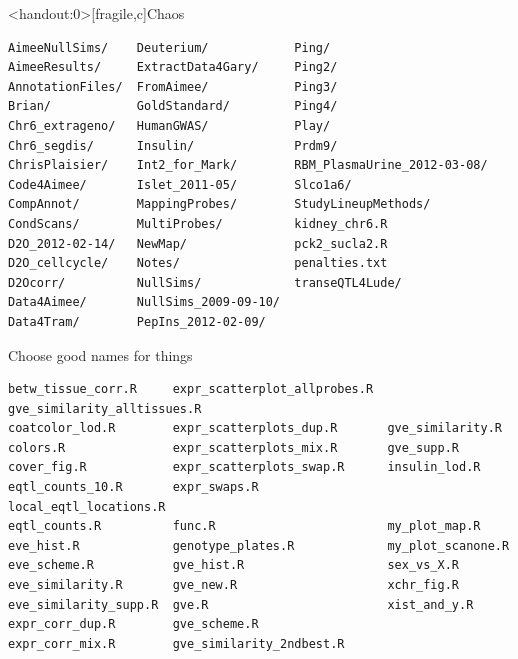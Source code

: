 \documentclass[aspectratio=169,12pt,t]{beamer}
\begin{document}
\begin{frame}<handout:0>[fragile,c]{Chaos}

\addtocounter{framenumber}{-1}

\begin{center}
\begin{minipage}[c]{11.33cm}
\begin{semiverbatim}
\lstset{basicstyle=\scriptsize}
\begin{lstlisting}[linewidth=11.33cm]
AimeeNullSims/    Deuterium/            Ping/
AimeeResults/     ExtractData4Gary/     Ping2/
AnnotationFiles/  FromAimee/            Ping3/
Brian/            GoldStandard/         Ping4/
Chr6_extrageno/   HumanGWAS/            Play/
Chr6_segdis/      Insulin/              Prdm9/
ChrisPlaisier/    Int2_for_Mark/        RBM_PlasmaUrine_2012-03-08/
Code4Aimee/       Islet_2011-05/        Slco1a6/
CompAnnot/        MappingProbes/        StudyLineupMethods/
CondScans/        MultiProbes/          kidney_chr6.R
D2O_2012-02-14/   NewMap/               pck2_sucla2.R
D2O_cellcycle/    Notes/                penalties.txt
D2Ocorr/          NullSims/             transeQTL4Lude/
Data4Aimee/       NullSims_2009-09-10/
Data4Tram/        PepIns_2012-02-09/
\end{lstlisting}
\end{semiverbatim}
\end{minipage}
\end{center}

\end{frame}



\begin{frame}[fragile,c]{Choose good names for things}

\begin{center}
\begin{minipage}[c]{13.7cm}
\begin{semiverbatim}
\lstset{basicstyle=\scriptsize}
\begin{lstlisting}[linewidth=13.7cm]
betw_tissue_corr.R     expr_scatterplot_allprobes.R  gve_similarity_alltissues.R
coatcolor_lod.R        expr_scatterplots_dup.R       gve_similarity.R
colors.R               expr_scatterplots_mix.R       gve_supp.R
cover_fig.R            expr_scatterplots_swap.R      insulin_lod.R
eqtl_counts_10.R       expr_swaps.R                  local_eqtl_locations.R
eqtl_counts.R          func.R                        my_plot_map.R
eve_hist.R             genotype_plates.R             my_plot_scanone.R
eve_scheme.R           gve_hist.R                    sex_vs_X.R
eve_similarity.R       gve_new.R                     xchr_fig.R
eve_similarity_supp.R  gve.R                         xist_and_y.R
expr_corr_dup.R        gve_scheme.R
expr_corr_mix.R        gve_similarity_2ndbest.R
\end{lstlisting}
\end{semiverbatim}
\end{minipage}
\end{center}

\end{frame}
\end{document}
